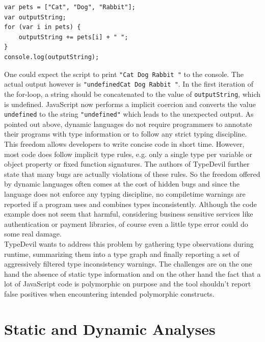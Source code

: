 \documentclass[runningheads,a4paper]{llncs}
\begin{document}
\medskip\medskip
\lstset{language=javascript}
\begin{minipage}{\textwidth}
\begin{lstlisting}[frame=single, caption=Implicit Coercions, label={listingPets}] 
var pets = ["Cat", "Dog", "Rabbit"];
var outputString;
for (var i in pets) {
    outputString += pets[i] + " ";
}
console.log(outputString);
\end{lstlisting}
\end{minipage}
One could expect the script to print \lstinline[columns=fixed]{"Cat Dog Rabbit "} to the console.
The actual output however is \lstinline[columns=fixed]{"undefinedCat Dog Rabbit "}. 
In the first iteration of the for-loop, a string should be concatenated to the value of \lstinline[columns=fixed]{outputString}, which is undefined. 
JavaScript now performs a implicit coercion and converts the value \lstinline[columns=fixed]{undefined} to the string \lstinline[columns=fixed]{"undefined"} which leads to the unexpected output.
As pointed out above, dynamic languages do not require programmers to annotate their programs with type information or to follow any strict typing discipline. 
This freedom allows developers to write concise code in short time. 
However, most code does follow implicit type rules, e.g. only a single type per variable or object property or fixed function signatures.
The authors of TypeDevil further state that many bugs are actually violations of these rules.
So the freedom offered by dynamic languages often comes at the cost of hidden bugs and since the language does not enforce any typing discipline, no compiletime warnings are reported if a program uses and combines types inconsistently.
Although the code example does not seem that harmful, considering business sensitive services like authentication or payment libraries, of course even a little type error could do some real damage. \\
TypeDevil wants to address this problem by gathering type observations during runtime, summarizing them into a type graph and finally reporting a set of aggressively filtered type inconsistency warnings.
The challenges are on the one hand the absence of static type information and on the other hand the fact that a lot of JavaScript code is polymorphic on purpose and the tool shouldn't report false positives when encountering intended polymorphic constructs.

\section{Static and Dynamic Analyses} \label{staticDynamicAnalysis}
\end{document}
